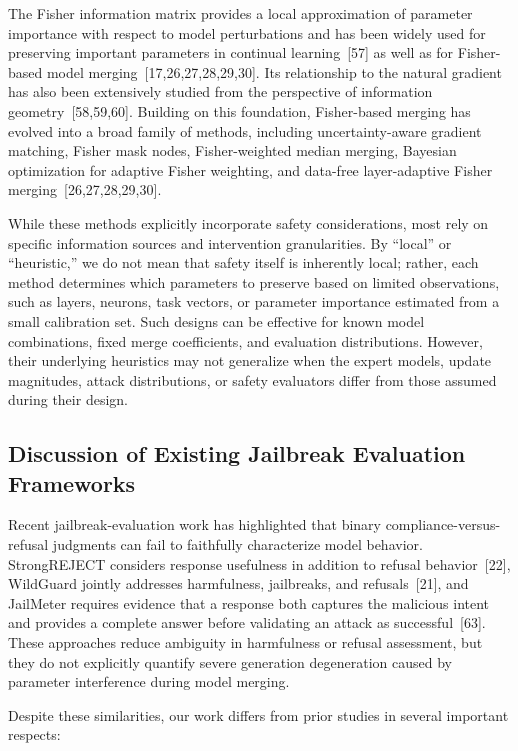 The Fisher information matrix provides a local approximation of parameter importance with respect to model perturbations and has been widely used for preserving important parameters in continual learning~[57] as well as for Fisher-based model merging~[17,26,27,28,29,30]. Its relationship to the natural gradient has also been extensively studied from the perspective of information geometry~[58,59,60]. Building on this foundation, Fisher-based merging has evolved into a broad family of methods, including uncertainty-aware gradient matching, Fisher mask nodes, Fisher-weighted median merging, Bayesian optimization for adaptive Fisher weighting, and data-free layer-adaptive Fisher merging~[26,27,28,29,30].


While these methods explicitly incorporate safety considerations, most rely on specific information sources and intervention granularities. By ``local'' or ``heuristic,'' we do not mean that safety itself is inherently local; rather, each method determines which parameters to preserve based on limited observations, such as layers, neurons, task vectors, or parameter importance estimated from a small calibration set. Such designs can be effective for known model combinations, fixed merge coefficients, and evaluation distributions. However, their underlying heuristics may not generalize when the expert models, update magnitudes, attack distributions, or safety evaluators differ from those assumed during their design.




\subsection{Discussion of Existing Jailbreak Evaluation Frameworks}

Recent jailbreak-evaluation work has highlighted that binary compliance-versus-refusal judgments can fail to faithfully characterize model behavior. StrongREJECT considers response usefulness in addition to refusal behavior~[22], WildGuard jointly addresses harmfulness, jailbreaks, and refusals~[21], and JailMeter requires evidence that a response both captures the malicious intent and provides a complete answer before validating an attack as successful~[63]. These approaches reduce ambiguity in harmfulness or refusal assessment, but they do not explicitly quantify severe generation degeneration caused by parameter interference during model merging.

Despite these similarities, our work differs from prior studies in several important respects:

